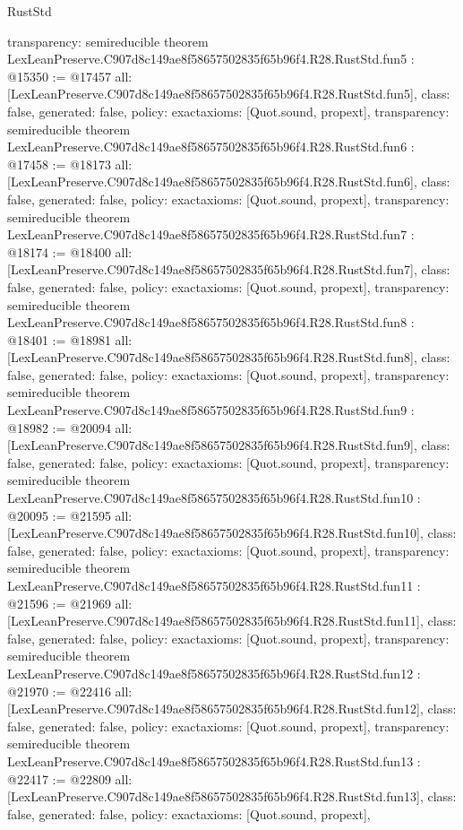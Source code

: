 \begin{lexlean}{RustStd}
\begin{coremodule}
{  transparency: semireducible
}
theorem LexLeanPreserve.C907d8c149ae8f58657502835f65b96f4.R28.RustStd.fun5 : @15350 := @17457 {
  all: [LexLeanPreserve.C907d8c149ae8f58657502835f65b96f4.R28.RustStd.fun5],
  class: false,
  generated: false,
  policy: exact{axioms: [Quot.sound, propext]},
  transparency: semireducible
}
theorem LexLeanPreserve.C907d8c149ae8f58657502835f65b96f4.R28.RustStd.fun6 : @17458 := @18173 {
  all: [LexLeanPreserve.C907d8c149ae8f58657502835f65b96f4.R28.RustStd.fun6],
  class: false,
  generated: false,
  policy: exact{axioms: [Quot.sound, propext]},
  transparency: semireducible
}
theorem LexLeanPreserve.C907d8c149ae8f58657502835f65b96f4.R28.RustStd.fun7 : @18174 := @18400 {
  all: [LexLeanPreserve.C907d8c149ae8f58657502835f65b96f4.R28.RustStd.fun7],
  class: false,
  generated: false,
  policy: exact{axioms: [Quot.sound, propext]},
  transparency: semireducible
}
theorem LexLeanPreserve.C907d8c149ae8f58657502835f65b96f4.R28.RustStd.fun8 : @18401 := @18981 {
  all: [LexLeanPreserve.C907d8c149ae8f58657502835f65b96f4.R28.RustStd.fun8],
  class: false,
  generated: false,
  policy: exact{axioms: [Quot.sound, propext]},
  transparency: semireducible
}
theorem LexLeanPreserve.C907d8c149ae8f58657502835f65b96f4.R28.RustStd.fun9 : @18982 := @20094 {
  all: [LexLeanPreserve.C907d8c149ae8f58657502835f65b96f4.R28.RustStd.fun9],
  class: false,
  generated: false,
  policy: exact{axioms: [Quot.sound, propext]},
  transparency: semireducible
}
theorem LexLeanPreserve.C907d8c149ae8f58657502835f65b96f4.R28.RustStd.fun10 : @20095 := @21595 {
  all: [LexLeanPreserve.C907d8c149ae8f58657502835f65b96f4.R28.RustStd.fun10],
  class: false,
  generated: false,
  policy: exact{axioms: [Quot.sound, propext]},
  transparency: semireducible
}
theorem LexLeanPreserve.C907d8c149ae8f58657502835f65b96f4.R28.RustStd.fun11 : @21596 := @21969 {
  all: [LexLeanPreserve.C907d8c149ae8f58657502835f65b96f4.R28.RustStd.fun11],
  class: false,
  generated: false,
  policy: exact{axioms: [Quot.sound, propext]},
  transparency: semireducible
}
theorem LexLeanPreserve.C907d8c149ae8f58657502835f65b96f4.R28.RustStd.fun12 : @21970 := @22416 {
  all: [LexLeanPreserve.C907d8c149ae8f58657502835f65b96f4.R28.RustStd.fun12],
  class: false,
  generated: false,
  policy: exact{axioms: [Quot.sound, propext]},
  transparency: semireducible
}
theorem LexLeanPreserve.C907d8c149ae8f58657502835f65b96f4.R28.RustStd.fun13 : @22417 := @22809 {
  all: [LexLeanPreserve.C907d8c149ae8f58657502835f65b96f4.R28.RustStd.fun13],
  class: false,
  generated: false,
  policy: exact{axioms: [Quot.sound, propext]},
}
\end{coremodule}
\end{lexlean}
